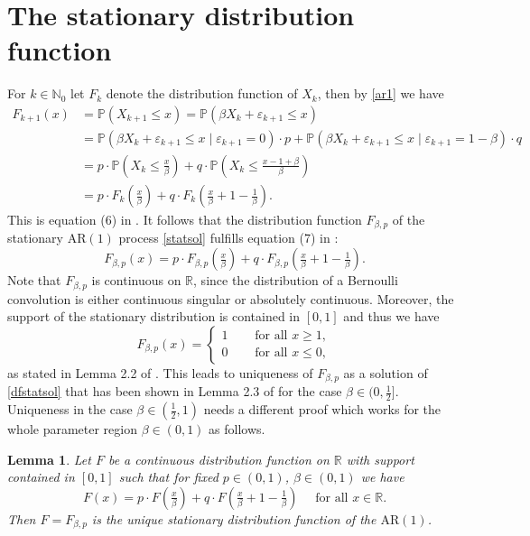 \documentclass[12pt]{amsart}
\newtheorem{lemma}[theorem]{Lemma}
\theoremstyle{definition}
\theoremstyle{remark}
\newcommand{\rr}{{\mathbb R}}
\newcommand{\nat}{{\mathbb N}}
\newcommand{\AR}{\operatorname{AR(1)}}
\newcommand{\eps}{{\varepsilon}}
\newcommand{\Pm}{{\mathbb P}}
\numberwithin{equation}{section}
\begin{document}
\section{The stationary distribution function}

For $k\in\nat_0$ let $F_k$ denote the distribution function of $X_k$, then by \eqref{ar1} we have
\begin{equation}\label{dfrecur}\begin{split}
F_{k+1}(x) & =\Pm(X_{k+1}\leq x)=\Pm(\beta X_{k}+\eps_{k+1}\leq x)\\
&=\Pm(\beta X_{k}+\eps_{k+1}\leq x\mid \eps_{k+1}=0)\cdot p+\Pm(\beta X_{k}+\eps_{k+1}\leq x\mid \eps_{k+1}=1-\beta)\cdot q\\
&=p\cdot\Pm(X_k\leq\tfrac{x}{\beta})+q\cdot\Pm(X_k\leq\tfrac{x-1+\beta}{\beta})\\
&=p\cdot F_k(\tfrac{x}{\beta})+q\cdot F_k(\tfrac{x}{\beta}+1-\tfrac1{\beta}).
\end{split}\end{equation}
This is equation (6) in \cite{Sterk}. It follows that the distribution function $F_{\beta,p}$ of the stationary $\AR$ process \eqref{statsol} fulfills equation (7) in \cite{Sterk}:
\begin{equation}\label{dfstatsol}
F_{\beta,p}(x) =p\cdot F_{\beta,p}(\tfrac{x}{\beta})+q\cdot F_{\beta,p}(\tfrac{x}{\beta}+1-\tfrac1{\beta}).
\end{equation}
Note that $F_{\beta,p}$ is continuous on $\rr$, since the distribution of a Bernoulli convolution is either continuous singular or absolutely continuous. Moreover, the support of the stationary distribution is contained in $[0,1]$ and thus we have 
$$F_{\beta,p}(x)=\begin{cases}
1 & \quad\text{ for all }x\geq 1,\\
0 & \quad\text{ for all }x\leq 0,
\end{cases}$$
as stated in Lemma 2.2 of \cite{Sterk}. This leads to uniqueness of $F_{\beta,p}$ as a solution of \eqref{dfstatsol} that has been shown in Lemma 2.3 of \cite{Sterk} for the case $\beta\in(0,\frac12]$. Uniqueness in the case $\beta\in(\frac12,1)$ needs a different proof which works for the whole parameter region $\beta\in(0,1)$ as follows.

\begin{lemma}\label{uniqueness}
Let $F$ be a continuous distribution function {on $\rr$} with support contained in $[0,1]$ such that for fixed $p\in(0,1)$, $\beta\in(0,1)$ we have
\begin{equation}\label{functionaleq}
\displaystyle F(x) =p\cdot F(\tfrac{x}{\beta})+q\cdot F(\tfrac{x}{\beta}+1-\tfrac1{\beta})\quad\text{ for all }x\in\rr.
\end{equation} 
Then $F=F_{\beta,p}$ is the unique stationary distribution function of the $\AR$.
\end{lemma}
\end{document}
